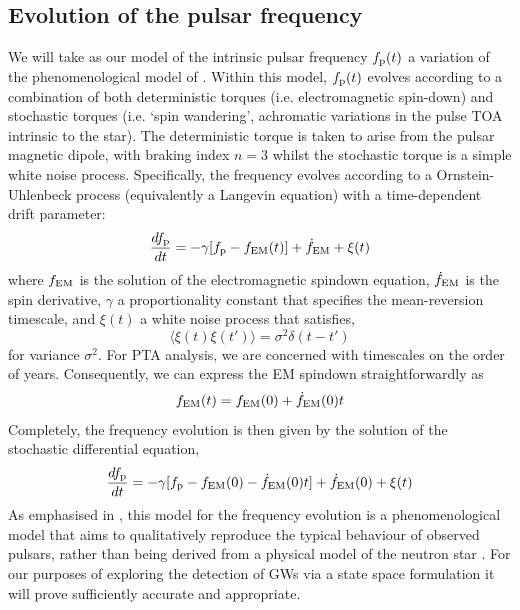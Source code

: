 \documentclass[fleqn,usenatbib,useAMS]{mnras}
\begin{document}
\subsection{Evolution of the pulsar frequency} \label{sec:psr_frequency}
We will take as our model of the intrinsic pulsar frequency $f_{\rm p}(t)$ a variation of the phenomenological model of \cite{Vargas}. Within this model, $f_{\rm p}(t)$ evolves according to a combination of both deterministic torques (i.e. electromagnetic spin-down) and stochastic torques (i.e. `spin wandering', achromatic variations in the pulse TOA intrinsic to the star). The deterministic torque is taken to arise from the pulsar magnetic dipole, with braking index $n=3$ whilst the stochastic torque is a simple white noise process. Specifically, the frequency evolves according to a Ornstein-Uhlenbeck process (equivalently a Langevin equation) with a time-dependent drift parameter:
\begin{equation}
	\frac{df_{\rm p}}{dt} = -\gamma	 [f_{\rm p} - f_{\rm EM} (t)] + \dot{f}_{\rm EM} + \xi(t)
	\label{eq:frequency_evolution}
\end{equation}
where $f_{\rm EM}$ is the solution of the electromagnetic spindown equation, $\dot{f}_{\rm EM}$ is the spin derivative, $\gamma$ a proportionality constant that specifies the mean-reversion timescale, and $\xi(t)$ a white noise process that satisfies,
\begin{equation}
	\langle \xi(t) \xi(t') \rangle = \sigma^2 \delta(t - t')
\end{equation}
for variance $\sigma^2$. For PTA analysis, we are concerned with timescales on the order of years. Consequently, we can express the EM spindown straightforwardly as
\begin{equation}
	f_{\rm EM} (t) = f_{\rm EM}(0) + \dot{f}_{\rm EM} (0)t
\end{equation}  
Completely, the frequency evolution is then given by the solution of the stochastic differential equation,
\begin{equation}
	\frac{df_{\rm p}}{dt} = -\gamma	 [f_{\rm p}- f_{\rm EM}(0) - \dot{f}_{\rm EM} (0)t] + \dot{f}_{\rm EM} (0) + \xi(t)
	\label{eq:frequency_evolution_expanded}
\end{equation}
As emphasised in \cite{Vargas}, this model for the frequency evolution is a phenomenological model that aims to qualitatively reproduce the typical behaviour of observed pulsars, rather than being derived from a physical model of the neutron star \citep[e.g. a model of the neutron star crust and superfluid, components][]{Meyers2021}. For our purposes of exploring the detection of GWs via a state space formulation it will prove sufficiently accurate and appropriate.
\end{document}

